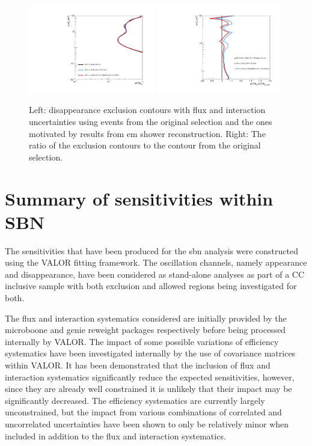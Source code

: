 \begin{figure}[h!]
    \centering
    \includegraphics[width = 0.49\textwidth]{figures-chap6/exclusion_contours/bias/nue_disapp_03d1.pdf}
    \includegraphics[width = 0.49\textwidth]{figures-chap6/exclusion_contours/bias/nue_disapp_03d1_ratio.pdf}
    \caption[\nue disappearance exclusion contours using events from the selection motivated by \gls{em} shower reconstruction.]{Left: \nue disappearance exclusion contours with flux and interaction uncertainties using events from the original selection and the ones motivated by results from \gls{em} shower reconstruction. Right: The ratio of the exclusion contours to the contour from the original selection.}
    \label{fig:nue_disapp_bias}
\end{figure}

\newpage
\section{\texorpdfstring{Summary of \nue sensitivities within SBN}{Summary of the nue sensitivities within SBN}}

The sensitivities that have been produced for the \gls{sbn} analysis were constructed using the VALOR fitting framework. The oscillation channels, namely \nue appearance and \nue disappearance, have been considered as stand-alone analyses as part of a \nue CC inclusive sample with both exclusion and allowed regions being investigated for both. 

The flux and interaction systematics considered are initially provided by the \gls{microboone} and \gls{genie} reweight packages respectively before being processed internally by VALOR. The impact of some possible variations of efficiency systematics have been investigated internally by the use of covariance matrices within VALOR. It has been demonstrated that the inclusion of flux and interaction systematics significantly reduce the expected sensitivities, however, since they are already well constrained it is unlikely that their impact may be significantly decreased. The efficiency systematics are currently largely unconstrained, but the impact from various combinations of correlated and uncorrelated uncertainties have been shown to only be relatively minor when included in addition to the flux and interaction systematics. 

